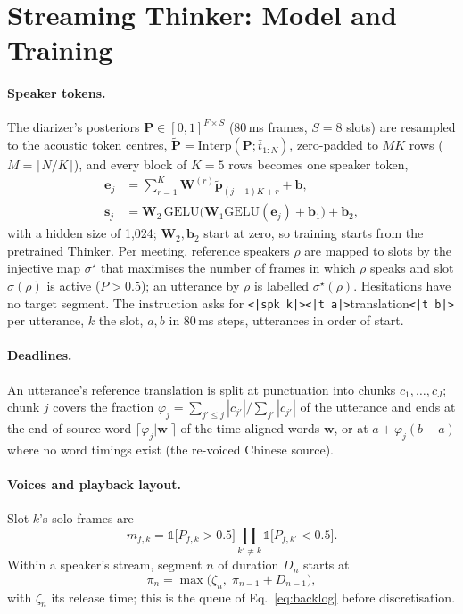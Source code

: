 \section{Streaming Thinker: Model and Training}
\label{app:model}
\label{app:train}
\label{app:causal}
\label{app:prompt}

\paragraph{Speaker tokens.} The diarizer's posteriors $\bm{P}\in[0,1]^{F\times S}$ (80\,ms frames, $S=8$ slots) are
resampled to the acoustic token centres, $\tilde{\bm{P}}=\mathrm{Interp}(\bm{P};\bar{t}_{1:N})$, zero-padded to $MK$
rows ($M=\lceil N/K\rceil$), and every block of $K=5$ rows becomes one speaker token,
\begin{equation}
\begin{aligned}
\bm{e}_j&=\textstyle\sum_{r=1}^{K}\bm{W}^{(r)}\tilde{\bm{p}}_{(j-1)K+r}+\bm{b},\\
\bm{s}_j&=\bm{W}_2\,\mathrm{GELU}\big(\bm{W}_1\mathrm{GELU}(\bm{e}_j)+\bm{b}_1\big)+\bm{b}_2,
\end{aligned}
\label{eq:conv}
\end{equation}
with a hidden size of 1{,}024; $\bm{W}_2,\bm{b}_2$ start at zero, so training starts from the pretrained Thinker.
Per meeting, reference speakers $\rho$ are mapped to slots by the injective map $\sigma^\star$ that maximises the
number of frames in which $\rho$ speaks and slot $\sigma(\rho)$ is active ($P>0.5$); an utterance by $\rho$ is
labelled $\sigma^\star(\rho)$. Hesitations have no target segment. The instruction asks for
\texttt{<|spk k|><|t a|>}translation\texttt{<|t b|>} per utterance, $k$ the slot, $a,b$ in 80\,ms steps, utterances
in order of start.

\paragraph{Deadlines.} An utterance's reference translation is split at punctuation into chunks $c_1,\dots,c_J$; chunk
$j$ covers the fraction $\varphi_j=\sum_{j'\le j}|c_{j'}|/\sum_{j'}|c_{j'}|$ of the utterance and ends at the end of
source word $\lceil\varphi_j|\bm{w}|\rceil$ of the time-aligned words $\bm{w}$, or at $a+\varphi_j(b-a)$ where no
word timings exist (the re-voiced Chinese source).

\paragraph{Voices and playback layout.} Slot $k$'s solo frames are
\begin{equation}
m_{f,k}=\mathds{1}\big[P_{f,k}>0.5\big]\textstyle\prod_{k'\neq k}\mathds{1}\big[P_{f,k'}<0.5\big].
\label{eq:alone}
\end{equation}
Within a speaker's stream, segment $n$ of duration $D_n$ starts at
\begin{equation}
\pi_n=\max\big(\zeta_n,\;\pi_{n-1}+D_{n-1}\big),
\label{eq:layout}
\end{equation}
with $\zeta_n$ its release time; this is the queue of Eq.~\eqref{eq:backlog} before discretisation.

